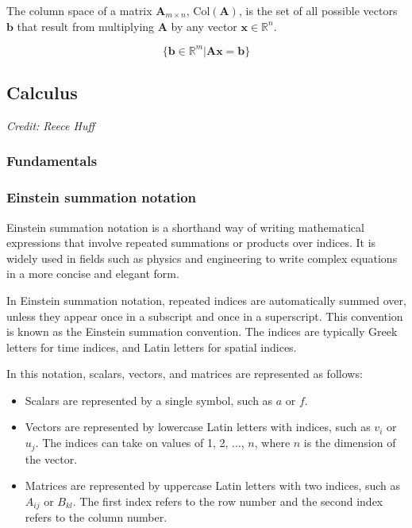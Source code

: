 \begin{definition}
The column space of a matrix $\mathbf{A}_{m \times n}$, $\mathrm{Col}(\mathbf{A})$,  is the set of all possible vectors $\mathbf{b}$ that result from multiplying  $\mathbf{A}$ by any vector $\mathbf{x} \in \mathbb{R}^n$.

\begin{equation}
    \{ \mathbf{b} \in \mathbb{R}^m | \mathbf{A} \mathbf{x} = \mathbf{b} \}
\end{equation}

\end{definition}

\newpage
\subsection{Calculus}
\label{sub_sec:calc}
\textit{Credit: Reece Huff}
\subsubsection{Fundamentals}
\subsubsection{Einstein summation notation}

Einstein summation notation is a shorthand way of writing mathematical expressions that involve repeated summations or products over indices. It is widely used in fields such as physics and engineering to write complex equations in a more concise and elegant form.

In Einstein summation notation, repeated indices are automatically summed over, unless they appear once in a subscript and once in a superscript. This convention is known as the Einstein summation convention. The indices are typically Greek letters for time indices, and Latin letters for spatial indices.

In this notation, scalars, vectors, and matrices are represented as follows:
\begin{itemize}
    \item Scalars are represented by a single symbol, such as $a$ or $f$.
    \item Vectors are represented by lowercase Latin letters with indices, such as $v_i$ or $u_j$. The indices can take on values of 1, 2, ..., $n$, where $n$ is the dimension of the vector.
    \item Matrices are represented by uppercase Latin letters with two indices, such as $A_{ij}$ or $B_{kl}$. The first index refers to the row number and the second index refers to the column number.
\end{itemize}

